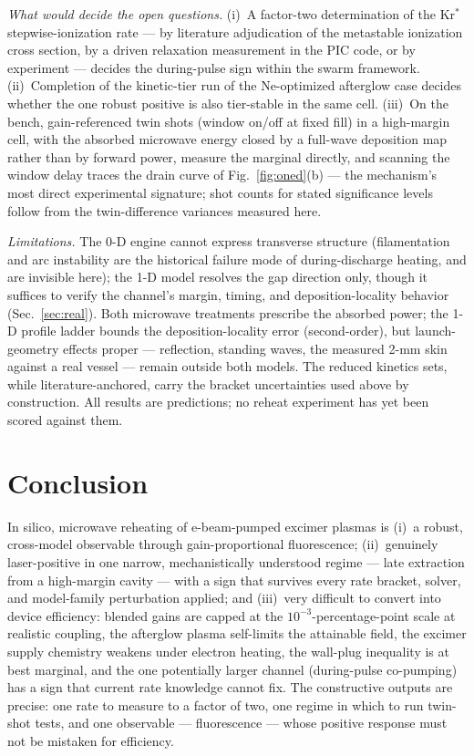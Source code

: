 \documentclass[aps,pra,preprint,longbibliography,nofootinbib]{revtex4-2}
\begin{document}
\emph{What would decide the open questions.} (i)~A factor-two
determination of the Kr$^*$ stepwise-ionization rate --- by literature
adjudication of the metastable ionization cross section, by a driven
relaxation measurement in the PIC code, or by experiment --- decides
the during-pulse sign within the swarm framework.
(ii)~Completion of the kinetic-tier run of the Ne-optimized afterglow
case decides whether the one robust positive is also tier-stable in
the same cell. (iii)~On the bench, gain-referenced twin shots (window
on/off at fixed fill) in a high-margin cell, with the absorbed
microwave energy closed by a full-wave deposition map rather than by
forward power, measure the marginal directly, and scanning the window
delay traces the drain curve of Fig.~\ref{fig:oned}(b) --- the
mechanism's most direct experimental signature; shot counts for stated
significance levels follow from the twin-difference variances measured
here.

\emph{Limitations.} The 0-D engine cannot express transverse structure
(filamentation and arc instability are the historical failure mode of
during-discharge heating, and are invisible here); the 1-D model
resolves the gap direction only, though it suffices to verify the
channel's margin, timing, and deposition-locality behavior
(Sec.~\ref{sec:real}). Both microwave treatments prescribe the
absorbed power; the 1-D profile ladder bounds the deposition-locality
error (second-order), but launch-geometry effects proper ---
reflection, standing waves, the measured 2-mm skin against a real
vessel --- remain outside both models. The reduced kinetics sets, while
literature-anchored, carry the bracket uncertainties used above by
construction. All results are predictions; no reheat experiment has
yet been scored against them.

\section{Conclusion}

In silico, microwave reheating of e-beam-pumped excimer plasmas is
(i)~a robust, cross-model observable through gain-proportional
fluorescence; (ii)~genuinely laser-positive in one narrow,
mechanistically understood regime --- late extraction from a
high-margin cavity --- with a sign that survives every rate bracket,
solver, and model-family perturbation applied; and (iii)~very
difficult to convert into device efficiency: blended gains are capped
at the $10^{-3}$-percentage-point scale at realistic coupling, the
afterglow plasma self-limits the attainable field, the excimer supply
chemistry weakens under electron heating, the wall-plug inequality is
at best marginal, and the one potentially larger channel (during-pulse
co-pumping) has a sign that current rate knowledge cannot fix. The
constructive outputs are precise: one rate to measure to a factor of
two, one regime in which to run twin-shot tests, and one observable
--- fluorescence --- whose positive response must not be mistaken for
efficiency.
\end{document}
